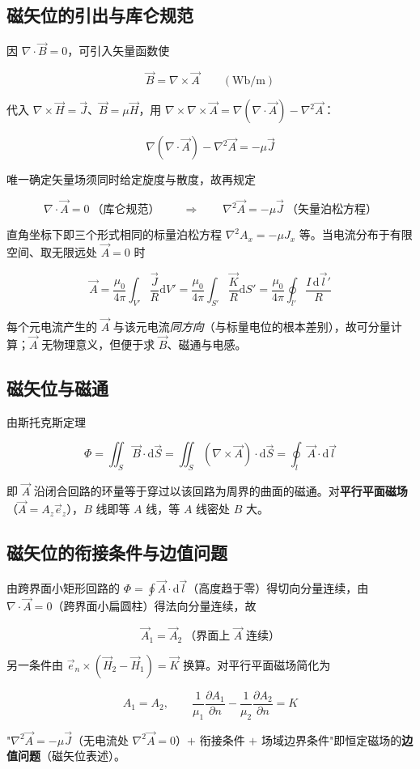 \subsection{磁矢位的引出与库仑规范}
因 $\nabla\cdot\vec{B}=0$，可引入矢量函数使
\begin{formulaBox}
\[
\vec{B}=\nabla\times\vec{A}\qquad(\mathrm{Wb/m})
\]
\end{formulaBox}
代入 $\nabla\times\vec{H}=\vec{J}$、$\vec{B}=\mu\vec{H}$，用 $\nabla\times\nabla\times\vec{A}=\nabla(\nabla\cdot\vec{A})-\nabla^2\vec{A}$：
\begin{formulaBox}
\[
\nabla(\nabla\cdot\vec{A})-\nabla^2\vec{A}=-\mu\vec{J}
\]
\end{formulaBox}
唯一确定矢量场须同时给定旋度与散度，故再规定
\begin{formulaBox}
\[
\nabla\cdot\vec{A}=0\ \text{（库仑规范）}
\qquad\Longrightarrow\qquad
\nabla^2\vec{A}=-\mu\vec{J}\ \text{（矢量泊松方程）}
\]
\end{formulaBox}
直角坐标下即三个形式相同的标量泊松方程 $\nabla^2A_x=-\mu J_x$ 等。当电流分布于有限空间、取无限远处 $\vec{A}=0$ 时
\begin{formulaBox}
\[
\vec{A}=\frac{\mu_0}{4\pi}\int_{V'}\frac{\vec{J}}{R}\mathrm{d}V'
=\frac{\mu_0}{4\pi}\int_{S'}\frac{\vec{K}}{R}\mathrm{d}S'
=\frac{\mu_0}{4\pi}\oint_{l'}\frac{I\,\mathrm{d}\vec{l}'}{R}
\]
\end{formulaBox}
每个元电流产生的 $\vec{A}$ 与该元电流\emph{同方向}（与标量电位的根本差别），故可分量计算；$\vec{A}$ 无物理意义，但便于求 $\vec{B}$、磁通与电感。

\subsection{磁矢位与磁通}
由斯托克斯定理
\begin{formulaBox}
\[
\Phi=\iint_S\vec{B}\cdot\mathrm{d}\vec{S}=\iint_S(\nabla\times\vec{A})\cdot\mathrm{d}\vec{S}=\oint_l\vec{A}\cdot\mathrm{d}\vec{l}
\]
\end{formulaBox}
即 $\vec{A}$ 沿闭合回路的环量等于穿过以该回路为周界的曲面的磁通。对\textbf{平行平面磁场}（$\vec{A}=A_z\vec{e}_z$），$B$ 线即等 $A$ 线，等 $A$ 线密处 $B$ 大。

\subsection{磁矢位的衔接条件与边值问题}
由跨界面小矩形回路的 $\Phi=\oint\vec{A}\cdot\mathrm{d}\vec{l}$（高度趋于零）得切向分量连续，由 $\nabla\cdot\vec{A}=0$（跨界面小扁圆柱）得法向分量连续，故
\begin{formulaBox}
\[
\vec{A}_1=\vec{A}_2\ \text{（界面上 $\vec{A}$ 连续）}
\]
\end{formulaBox}
另一条件由 $\vec{e}_n\times(\vec{H}_2-\vec{H}_1)=\vec{K}$ 换算。对平行平面磁场简化为
\begin{formulaBox}
\[
A_1=A_2,
\qquad
\frac{1}{\mu_1}\frac{\partial A_1}{\partial n}-\frac{1}{\mu_2}\frac{\partial A_2}{\partial n}=K
\]
\end{formulaBox}
"$\nabla^2\vec{A}=-\mu\vec{J}$（无电流处 $\nabla^2\vec{A}=0$）$+$ 衔接条件 $+$ 场域边界条件"即恒定磁场的\textbf{边值问题}（磁矢位表述）。

